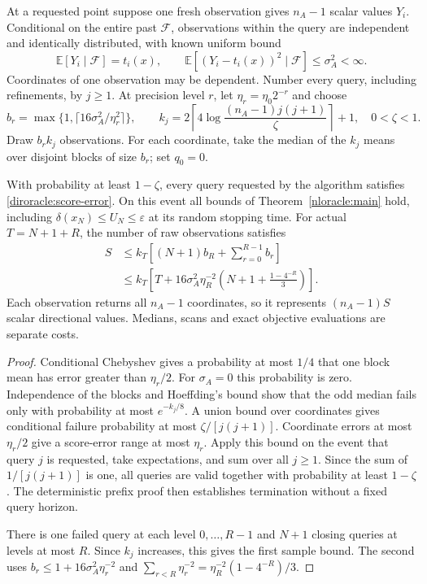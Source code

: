 At a requested point suppose one fresh observation gives $n_A-1$
scalar values $Y_i$. Conditional on the entire past $\mathcal F$,
observations within the query are independent and identically distributed,
with known uniform bound
\begin{equation}\label{diroracle:moment}
 \mathbb E[Y_i\mid\mathcal F]=t_i(x),\qquad
 \mathbb E[(Y_i-t_i(x))^2\mid\mathcal F]\le\sigma_A^2<\infty.
\end{equation}
Coordinates of one observation may be dependent.
Number every query, including refinements, by $j\ge1$.
At precision level $r$, let $\eta_r=\eta_0 2^{-r}$ and choose
\begin{equation}\label{diroracle:batch}
 b_r=\max\{1,\lceil16\sigma_A^2/\eta_r^2\rceil\},\qquad
 k_j=2\left\lceil4\log\frac{(n_A-1)j(j+1)}\zeta\right\rceil+1,
 \quad 0<\zeta<1.
\end{equation}
Draw $b_rk_j$ observations. For each coordinate, take the median of
the $k_j$ means over disjoint blocks of size $b_r$; set $q_0=0$.

\begin{theorem}\label{diroracle:sampling}
With probability at least $1-\zeta$, every query requested by the
algorithm satisfies \eqref{diroracle:score-error}. On this event all
bounds of Theorem~\ref{nloracle:main} hold, including
$\delta(x_N)\le U_N\le\varepsilon$ at its random stopping time.
For actual $T=N+1+R$, the number of raw observations satisfies
\begin{align}\label{diroracle:samples}
 S&\le k_T\left[(N+1)b_R+\sum_{r=0}^{R-1}b_r\right]\\
  &\le k_T\left[T+16\sigma_A^2\eta_R^{-2}
       \left(N+1+\frac{1-4^{-R}}3\right)\right].\nonumber
\end{align}
Each observation returns all $n_A-1$ coordinates, so it represents
$(n_A-1)S$ scalar directional values. Medians, scans and exact
objective evaluations are separate costs.
\end{theorem}
\begin{proof}
Conditional Chebyshev gives a probability at most $1/4$ that one block
mean has error greater than $\eta_r/2$. For $\sigma_A=0$ this probability
is zero. Independence of the blocks and Hoeffding's bound show that
the odd median fails only with probability at most $e^{-k_j/8}$.
A union bound over coordinates gives conditional failure probability
at most $\zeta/[j(j+1)]$. Coordinate errors at most $\eta_r/2$
give a score-error range at most $\eta_r$.
Apply this bound on the event that query $j$
is requested, take expectations, and sum over all $j\ge1$.
Since the sum of $1/[j(j+1)]$ is one, all queries are valid together
with probability at least $1-\zeta$. The deterministic prefix proof
then establishes termination without a fixed query horizon.

There is one failed query at each level $0,\ldots,R-1$ and $N+1$
closing queries at levels at most $R$. Since $k_j$ increases, this
gives the first sample bound. The second uses
$b_r\le1+16\sigma_A^2\eta_r^{-2}$ and
$\sum_{r<R}\eta_r^{-2}=\eta_R^{-2}(1-4^{-R})/3$.
\end{proof}

